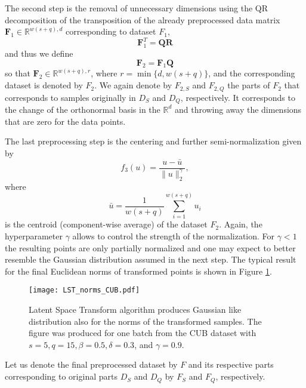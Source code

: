 \documentclass[letterpaper]{article} \usepackage{aaai20}  \usepackage{times}  \usepackage{helvet} \usepackage{courier}  \usepackage[hyphens]{url}  \usepackage{graphicx} \urlstyle{rm} \def\UrlFont{\rm}  \usepackage{graphicx}  \frenchspacing  \setlength{\pdfpagewidth}{8.5in}  \setlength{\pdfpageheight}{11in}  \usepackage[ruled,vlined]{algorithm2e}
\begin{document}
The second step is the removal of unnecessary dimensions using the QR decomposition of the transposition of the already preprocessed data matrix 
$\mathbf{F}_{1} \in \mathbb R^{w(s+q), d}$ corresponding to dataset $F_1$,
\[
    \mathbf F_1^T = \mathbf Q \mathbf R
\]
and thus we define
\[
    \mathbf F_2 = \mathbf F_1 \mathbf Q
\]
so that $\mathbf F_2 \in \mathbb R^{w(s+q), r}$, where $r = \min\{d, w (s + q)\}$, and the corresponding dataset is denoted by $F_2$.
We again denote by $F_{2,S}$ and $F_{2,Q}$ the parts of $F_2$ that corresponds to samples originally in $D_S$ and $D_Q$, respectively.
It corresponds to the change of the orthonormal basis in the $\mathbb R^d$ and throwing away the dimensions that are zero for the data points.

The last preprocessing step is the centering and further semi-normalization given by
\[
    f_3(u) = \frac{u - \bar u}{\|u\|_{2}^{\gamma}},
\]
where 
\[
    \bar u = \frac{1}{w(s+q)}\sum_{i = 1}^{w(s+q)} u_i
\]
is the centroid (component-wise average) of the dataset $F_2$.
Again, the hyperparameter $\gamma$ allows to control the strength of the normalization. For $\gamma < 1$ the resulting points are only partially
normalized and one may expect to better resemble the Gaussian distribution assumed in the next step. The typical result for the final Euclidean norms of transformed points is shown in Figure \ref{fig:normsLST}.
\begin{figure}[h]
  \texttt{[image: LST\_norms\_CUB.pdf]}
  \caption{Latent Space Transform algorithm produces Gaussian like distribution also for the norms of the transformed samples. 
  The figure was produced for one batch from the CUB dataset with $s = 5, q = 15, \beta = 0.5, \delta = 0.3$, and $\gamma = 0.9$.}
  \label{fig:normsLST}
\end{figure}

Let us denote the final preprocessed dataset by $F$ and its respective parts corresponding to original parts $D_S$ and $D_Q$ by $F_S$ and $F_Q$, respectively.
\end{document}
